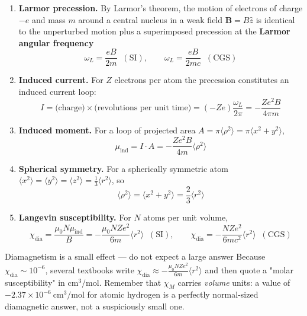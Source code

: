 \documentclass[11pt,a4paper]{article}
\newcommand{\vb}[1]{\mathbf{#1}}
\begin{document}
\begin{enumerate}[leftmargin=1.6cm]
    \item \textbf{Larmor precession.} By Larmor's theorem, the motion of electrons of charge $-e$ and mass $m$ around a central nucleus in a weak field $\vb{B} = B\hat{z}$ is identical to the unperturbed motion plus a superimposed precession at the \textbf{Larmor angular frequency}
    \begin{equation}
        \omega_L = \frac{eB}{2m}\;\;(\text{SI}),
        \qquad
        \omega_L = \frac{eB}{2mc}\;\;(\text{CGS})
        \label{eq:larmorfreq}
    \end{equation}
    \item \textbf{Induced current.} For $Z$ electrons per atom the precession constitutes an induced current loop:
    \begin{equation}
        I = \text{(charge)}\times\text{(revolutions per unit time)}
          = (-Ze)\frac{\omega_L}{2\pi} = -\frac{Ze^2B}{4\pi m}
        \label{eq:inducedI}
    \end{equation}
    \item \textbf{Induced moment.} For a loop of projected area $A = \pi\langle\rho^2\rangle = \pi\langle x^2+y^2\rangle$,
    \begin{equation}
        \mu_{\mathrm{ind}} = I\cdot A = -\frac{Ze^2B}{4m}\langle\rho^2\rangle
        \label{eq:muind}
    \end{equation}
    \item \textbf{Spherical symmetry.} For a spherically symmetric atom $\langle x^2\rangle = \langle y^2\rangle = \langle z^2\rangle = \frac{1}{3}\langle r^2\rangle$, so
    \begin{equation}
        \langle\rho^2\rangle = \langle x^2+y^2\rangle = \frac{2}{3}\langle r^2\rangle
        \label{eq:rho2}
    \end{equation}
    \item \textbf{Langevin susceptibility.} For $N$ atoms per unit volume,
    \begin{equation}
        \chi_{\mathrm{dia}} = \frac{\mu_0N\mu_{\mathrm{ind}}}{B}
        = -\frac{\mu_0 NZ e^2}{6m}\langle r^2\rangle\;\;(\text{SI}),
        \qquad
        \chi_{\mathrm{dia}} = -\frac{NZe^2}{6mc^2}\langle r^2\rangle\;\;(\text{CGS})
        \label{eq:langdia}
    \end{equation}
\end{enumerate}

\begin{pitfallbox}{Diamagnetism is a small effect --- do not expect a large answer}
Because $\chi_{\mathrm{dia}} \sim 10^{-6}$, several textbooks write $\chi_{\mathrm{dia}} \approx -\frac{\mu_0 NZ e^2}{6m}\langle r^2\rangle$ and then quote a "molar susceptibility" in $\mathrm{cm^3/mol}$. Remember that $\chi_M$ carries \emph{volume} units: a value of $-2.37\times10^{-6}\ \mathrm{cm^3/mol}$ for atomic hydrogen is a perfectly normal-sized diamagnetic answer, not a suspiciously small one.
\end{pitfallbox}
\end{document}
